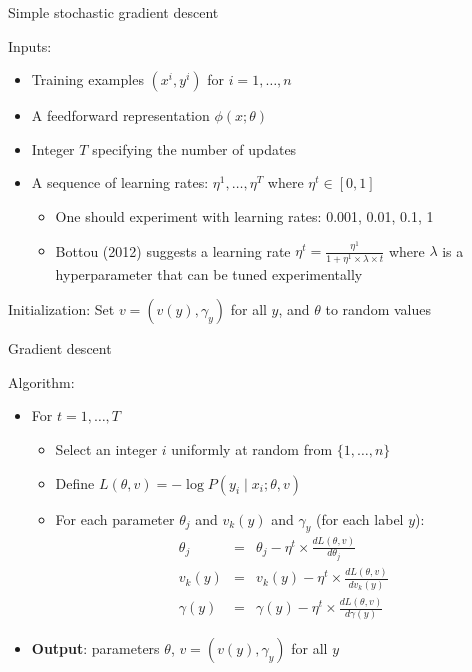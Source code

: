 \begin{frame}{Simple stochastic gradient descent}
\begin{block}{Inputs:}
\begin{itemize}[<+->]
\item Training examples $(x^i, y^i)$ for $i = 1, \ldots, n$
\item A feedforward representation $\phi(x; \theta)$
\item Integer $T$ specifying the number of updates
\item A sequence of learning rates: $\eta^1, \ldots, \eta^T$ where $\eta^t \in [0,1]$
\begin{itemize}[<+->]
\item One should experiment with learning rates: 0.001, 0.01, 0.1, 1
\item Bottou (2012) suggests a learning rate $\eta^t = \frac{\eta^1}{1 + \eta^1 \times \lambda \times t}$ where $\lambda$ is a hyperparameter that can be tuned experimentally
\end{itemize}
\end{itemize}
\end{block}
\pause
\begin{block}{Initialization:}
Set $v = (v(y), \gamma_y)$ for all $y$, and $\theta$ to random values
\end{block}
\end{frame}


\begin{frame}{Gradient descent}
\begin{block}{Algorithm:}
\begin{itemize}[<+->]
\item For $t = 1, \ldots, T$
\begin{itemize}[<+->]
\item Select an integer $i$ uniformly at random from $\{ 1, \ldots, n \}$
\item Define $L(\theta, v) = - \log P(y_i \mid x_i; \theta, v)$
\item For each parameter $\theta_j$ and $v_k(y)$ and $\gamma_y$ (for each label $y$):
\begin{eqnarray*}
\theta_j &=& \theta_j - \eta^t \times \frac{dL(\theta,v)}{d\theta_j} \\
v_k(y) &=& v_k(y) - \eta^t \times \frac{dL(\theta,v)}{d v_k(y)} \\
\gamma(y) &=& \gamma(y) - \eta^t \times \frac{dL(\theta,v)}{d \gamma(y)}
\end{eqnarray*}
\end{itemize}
\item \textbf{Output}: parameters $\theta$, $v = (v(y), \gamma_y)$ for all $y$
\end{itemize}
\end{block}
\end{frame}


